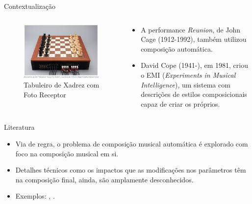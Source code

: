 \documentclass[xcolor=table]{beamer}
\begin{document}
    \begin{frame}{Contextualização}
        \begin{columns}[onlytextwidth,t]
            \begin{column}{0.5\textwidth}
                \centering
                \vspace{-0.5cm}
                \begin{figure}
                    \includegraphics[scale=0.32]{figuras/reunion_board.PNG}
                    \caption{Tabuleiro de Xadrez com Foto Receptor}
	            \end{figure}
            \end{column}
            \begin{column}{0.46\textwidth}
                \centering
                \begin{itemize}
                    \justifying
                    \item A performance \textit{Reunion}, de John Cage (1912-1992), também utilizou composição automática.
                    \item David Cope (1941-), em 1981, criou o EMI (\textit{Experiments in Musical Intelligence}), um sistema com descrições de estilos composicionais capaz de criar os próprios.
                \end{itemize}
            \end{column}
        \end{columns}
    \end{frame}

    \begin{frame}{Literatura}
        \begin{itemize}
            \justifying
            \item Via de regra, o problema de composição musical automática é explorado com foco na composição musical em si.
            \item Detalhes técnicos como os impactos que as modificações nos parâmetros têm na composição final, ainda, são amplamente desconhecidos.
            \item Exemplos: \citet{agarwala2017}, \citet{kuang2021}.
        \end{itemize}
    \end{frame}
    
\end{document}
